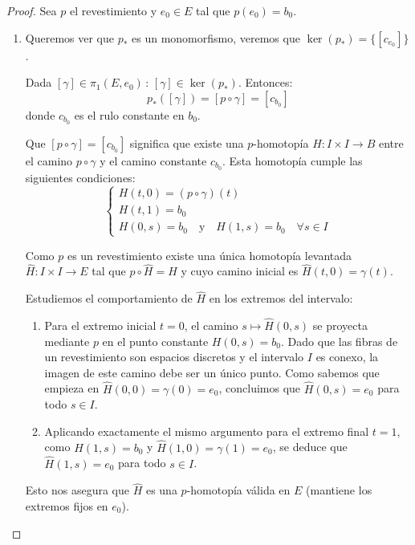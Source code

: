 \documentclass{article}
\theoremstyle{plain}
\theoremstyle{definition}
\begin{document}
\begin{proof}
    Sea \( p \) el revestimiento y \( e_0 \in E \) tal que \( p(e_0) = b_0 \).
    \begin{enumerate}
        \item Queremos ver que \( p_* \) es un monomorfismo, veremos que \( \ker(p_*) = \{ [c_{e_0}] \} \).

              Dada \( [\gamma] \in \pi_1(E, e_0) \, : \, [\gamma] \in \ker(p_*) \). Entonces:
              \[ p_*({[\gamma]}) = [p \circ \gamma] = [c_{b_0}] \]
              donde \( c_{b_0} \) es el rulo constante en \( b_0 \).

              Que \( [p \circ \gamma] = [c_{b_0}] \) significa que existe una \( p \)-homotopía \( H : I \times I \rightarrow B \) entre el camino \( p \circ \gamma \) y el camino constante \( c_{b_0} \). Esta homotopía cumple las siguientes condiciones:
              \[
                  \begin{cases}
                      H(t,0) = (p \circ \gamma)(t) \\
                      H(t,1) = b_0                 \\
                      H(0,s) = b_0 \quad \text{y} \quad H(1,s) = b_0 \quad \forall s \in I
                  \end{cases}
              \]

              Como \( p \) es un revestimiento existe una única homotopía levantada \( \hat{H} : I \times I \rightarrow E \) tal que \( p \circ \hat{H} = H \) y cuyo camino inicial es \( \hat{H}(t,0) = \gamma(t) \).

              Estudiemos el comportamiento de \( \hat{H} \) en los extremos del intervalo:
              \begin{enumerate}
                  \item[1.] Para el extremo inicial \( t=0 \), el camino \( s \mapsto \hat{H}(0,s) \) se proyecta mediante \( p \) en el punto constante \( H(0,s) = b_0 \). Dado que las fibras de un revestimiento son espacios discretos y el intervalo \( I \) es conexo, la imagen de este camino debe ser un único punto. Como sabemos que empieza en \( \hat{H}(0,0) = \gamma(0) = e_0 \), concluimos que \( \hat{H}(0,s) = e_0 \) para todo \( s \in I \).
                  \item[2.] Aplicando exactamente el mismo argumento para el extremo final \( t=1 \), como \( H(1,s) = b_0 \) y \( \hat{H}(1,0) = \gamma(1) = e_0 \), se deduce que \( \hat{H}(1,s) = e_0 \) para todo \( s \in I \).
              \end{enumerate}
              Esto nos asegura que \( \hat{H} \) es una \( p \)-homotopía válida en \( E \) (mantiene los extremos fijos en \( e_0 \)).


\end{enumerate}
\end{proof}
\end{document}
